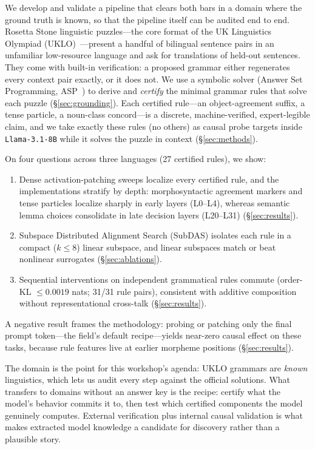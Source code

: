 \documentclass{article}
\begin{document}
We develop and validate a pipeline that clears both bars in a domain where the
ground truth is known, so that the pipeline itself can be audited end to end.
Rosetta Stone linguistic puzzles---the core format of the UK Linguistics
Olympiad (UKLO)~\citep{bozhanov2013,lingoly}---present a handful of bilingual
sentence pairs in an unfamiliar low-resource language and ask for translations
of held-out sentences. They come with built-in verification: a proposed
grammar either regenerates every context pair exactly, or it does not. We use
a symbolic solver (Answer Set Programming, ASP~\citep{clingo}) to derive and
\emph{certify} the minimal grammar rules that solve each puzzle
(\S\ref{sec:grounding}). Each certified rule---an object-agreement suffix, a
tense particle, a noun-class concord---is a discrete, machine-verified,
expert-legible claim, and we take exactly these rules (no others) as causal
probe targets inside \texttt{Llama-3.1-8B} while it solves the puzzle in
context (\S\ref{sec:methods}).

On four questions across three languages (27 certified rules), we show:
\begin{enumerate}[leftmargin=1.6em,itemsep=1pt,topsep=2pt]
\item Dense activation-patching sweeps localize every certified rule, and the
implementations stratify by depth: morphosyntactic agreement markers and tense
particles localize sharply in early layers (L0--L4), whereas semantic lemma
choices consolidate in late decision layers (L20--L31)
(\S\ref{sec:results}).
\item Subspace Distributed Alignment Search (SubDAS) isolates each rule in a
compact ($k\le 8$) linear subspace, and linear subspaces match or beat
nonlinear surrogates (\S\ref{sec:ablations}).
\item Sequential interventions on independent grammatical rules commute
(order-KL $\le 0.0019$ nats; 31/31 rule pairs), consistent with additive
composition without representational cross-talk (\S\ref{sec:results}).
\end{enumerate}
A negative result frames the methodology: probing or patching only the final
prompt token---the field's default recipe---yields near-zero causal effect on
these tasks, because rule features live at earlier morpheme positions
(\S\ref{sec:results}).

The domain is the point for this workshop's agenda: UKLO grammars are
\emph{known} linguistics, which lets us audit every step against the official
solutions. What transfers to domains without an answer key is the recipe:
certify what the model's behavior commits it to, then test which certified
components the model genuinely computes. External verification plus internal
causal validation is what makes extracted model knowledge a candidate for
discovery rather than a plausible story.
\end{document}
